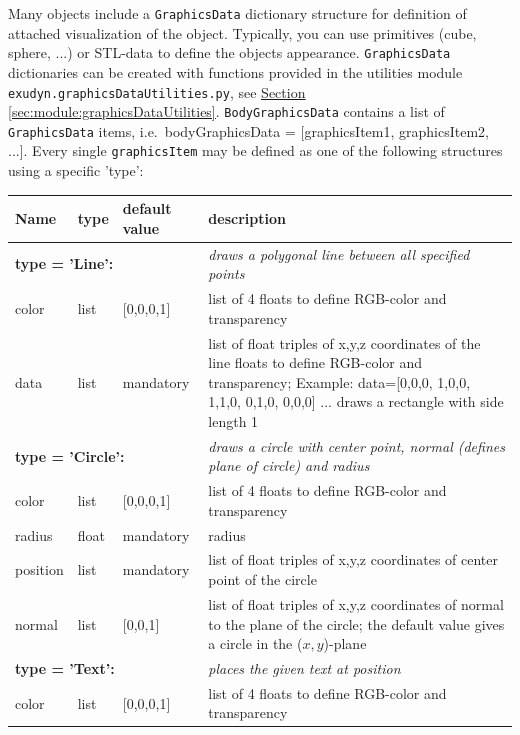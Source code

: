 \documentclass[11pt,a4paper]{book}
\newcommand{\refSection}[1]{\hyperref[#1]{\underline{Section \ref*{#1}}}} %
\begin{document}
Many objects include a \texttt{GraphicsData} dictionary structure for definition of attached visualization of the object. Typically, you can use primitives (cube, sphere, ...) or STL-data to define the objects appearance.
\texttt{GraphicsData} dictionaries can be created with functions provided in the utilities module \texttt{exudyn.graphicsDataUtilities.py}, see \refSection{sec:module:graphicsDataUtilities}.
\texttt{BodyGraphicsData} contains a list of \texttt{GraphicsData} items, i.e.\ bodyGraphicsData = [graphicsItem1, graphicsItem2, ...]. Every single \texttt{graphicsItem} may be defined as one of the following structures using a specific 'type':
\begin{center}
  \footnotesize
  \begin{longtable}{| p{3cm} | p{2cm} | p{3cm} | p{7.5cm} |} 
	\hline
  \bf Name & \bf type & \bf default value & \bf description \\ \hline
%
	\multicolumn{3}{l}{\parbox{8cm}{\bf type = 'Line': }} & \multicolumn{1}{l}{\parbox{7.5cm}{\it draws a polygonal line between all specified points}}\\ \hline
  color & list & [0,0,0,1] & list of 4 floats to define RGB-color and transparency\\ \hline
  data & list &  mandatory & list of float triples of x,y,z coordinates of the line floats to define RGB-color and transparency; Example: data=[0,0,0, 1,0,0, 1,1,0, 0,1,0, 0,0,0] ... draws a rectangle with side length 1\\ \hline
%
	\multicolumn{3}{l}{\parbox{8cm}{\bf type = 'Circle': }} & \multicolumn{1}{l}{\parbox{7.5cm}{\it draws a circle with center point, normal (defines plane of circle) and radius}}\\ \hline
  color & list & [0,0,0,1] & list of 4 floats to define RGB-color and transparency\\ \hline
  radius & float & mandatory & radius\\ \hline
  position & list & mandatory & list of float triples of x,y,z coordinates of center point of the circle\\ \hline
  normal & list & [0,0,1] & list of float triples of x,y,z coordinates of normal to the plane of the circle; the default value gives a circle in the ($x,y$)-plane\\ \hline
	\multicolumn{3}{l}{\parbox{8cm}{\bf type = 'Text': }} & \multicolumn{1}{l}{\parbox{7.5cm}{\it places the given text at position}}\\ \hline
  color & list & [0,0,0,1] & list of 4 floats to define RGB-color and transparency\\ \hline

\end{longtable}
\end{center}
\end{document}
